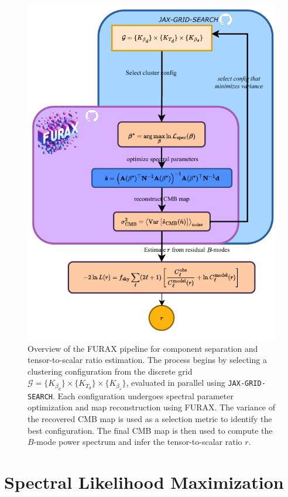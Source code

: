 \documentclass[%
 reprint,
bibnotes,
 amsmath,amssymb,
 aps,
floatfix, 
]{revtex4-2}
\begin{document}
\begin{figure}[htbp]
    \centering
    \includegraphics[width=\linewidth]{figures/FURAX-CS.pdf}
    \caption{
        Overview of the \textsc{FURAX} pipeline for component separation and tensor-to-scalar ratio estimation. The process begins by selecting a clustering configuration from the discrete grid \( \mathcal{G} = \{K_{\beta_d}\} \times \{K_{T_d}\} \times \{K_{\beta_s}\} \), evaluated in parallel using \texttt{JAX-GRID-SEARCH}. Each configuration undergoes spectral parameter optimization and map reconstruction using \textsc{FURAX}. The variance of the recovered CMB map is used as a selection metric to identify the best configuration. The final CMB map is then used to compute the \( B \)-mode power spectrum and infer the tensor-to-scalar ratio \( r \). 
    }
    \label{fig:furax_pipeline}
\end{figure}

\section{Spectral Likelihood Maximization}
\end{document}
